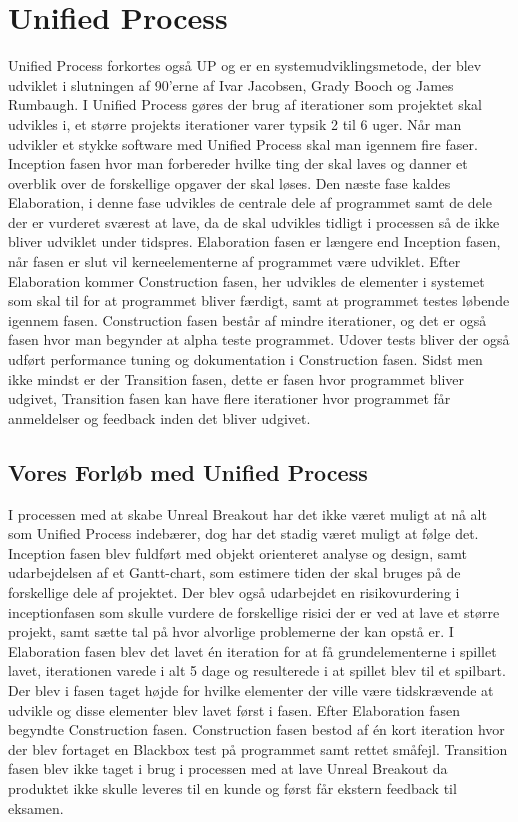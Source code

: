 \section{Unified Process}
Unified Process forkortes også UP og er en systemudviklingsmetode, der blev udviklet i slutningen af 90'erne af Ivar Jacobsen, Grady Booch og James Rumbaugh. I Unified Process gøres der brug af iterationer som projektet skal udvikles i, et større projekts iterationer varer typsik 2 til 6 uger. Når man udvikler et stykke software med Unified Process skal man igennem fire faser. Inception fasen hvor man forbereder hvilke ting der skal laves og danner et overblik over de forskellige opgaver der skal løses. Den næste fase kaldes Elaboration, i denne fase udvikles de centrale dele af programmet samt de dele der er vurderet sværest at lave, da de skal udvikles tidligt i processen så de ikke bliver udviklet under tidspres. Elaboration fasen er længere end Inception fasen, når fasen er slut vil kerneelementerne af programmet være udviklet. Efter Elaboration kommer Construction fasen, her udvikles de elementer i systemet som skal til for at programmet bliver færdigt, samt at programmet testes løbende igennem fasen. Construction fasen består af mindre iterationer, og det er også fasen hvor man begynder at alpha teste programmet. Udover tests bliver der også udført performance tuning og dokumentation i Construction fasen. Sidst men ikke mindst er der Transition fasen, dette er fasen hvor programmet bliver udgivet, Transition fasen kan have flere iterationer hvor programmet får anmeldelser og feedback inden det bliver udgivet. \newline
\newline
\subsection{Vores Forløb med Unified Process}
I processen med at skabe Unreal Breakout har det ikke været muligt at nå alt som Unified Process indebærer, dog har det stadig været muligt at følge det. Inception fasen blev fuldført med objekt orienteret analyse og design, samt udarbejdelsen af et Gantt-chart, som estimere tiden der skal bruges på de forskellige dele af projektet. Der blev også udarbejdet en risikovurdering i inceptionfasen som skulle vurdere de forskellige risici der er ved at lave et større projekt, samt sætte tal på hvor alvorlige problemerne der kan opstå er. \newline
I Elaboration fasen blev det lavet én iteration for at få grundelementerne i spillet lavet, iterationen varede i alt 5 dage og resulterede i at spillet blev til et spilbart. Der blev i fasen taget højde for hvilke elementer der ville være tidskrævende at udvikle og disse elementer blev lavet først i fasen. \newline
Efter Elaboration fasen begyndte Construction fasen. Construction fasen bestod af én kort iteration hvor der blev fortaget en Blackbox test på programmet samt rettet småfejl. 
\newline
Transition fasen blev ikke taget i brug i processen med at lave Unreal Breakout da produktet ikke skulle leveres til en kunde og først får ekstern feedback til eksamen. 
 

 